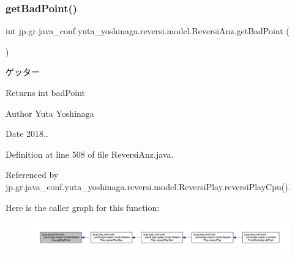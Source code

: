 \subsubsection{\texorpdfstring{get\+Bad\+Point()}{getBadPoint()}}
{\footnotesize\ttfamily int jp.\+gr.\+java\+\_\+conf.\+yuta\+\_\+yoshinaga.\+reversi.\+model.\+Reversi\+Anz.\+get\+Bad\+Point (\begin{DoxyParamCaption}{ }\end{DoxyParamCaption})}



ゲッター 

\begin{DoxyReturn}{Returns}
int bad\+Point 
\end{DoxyReturn}
\begin{DoxyAuthor}{Author}
Yuta Yoshinaga 
\end{DoxyAuthor}
\begin{DoxyDate}{Date}
2018.. 
\end{DoxyDate}


Definition at line 508 of file Reversi\+Anz.\+java.



Referenced by jp.\+gr.\+java\+\_\+conf.\+yuta\+\_\+yoshinaga.\+reversi.\+model.\+Reversi\+Play.\+reversi\+Play\+Cpu().

Here is the caller graph for this function\+:
\nopagebreak
\begin{figure}[H]
\begin{center}
\leavevmode
\includegraphics[width=350pt]{classjp_1_1gr_1_1java__conf_1_1yuta__yoshinaga_1_1reversi_1_1model_1_1_reversi_anz_ad70f21aae68f33fd2b91459bd23005bc_icgraph}
\end{center}
\end{figure}
\mbox{\label{classjp_1_1gr_1_1java__conf_1_1yuta__yoshinaga_1_1reversi_1_1model_1_1_reversi_anz_a5d51a4bf3440b83a671374a312873a23}} 
